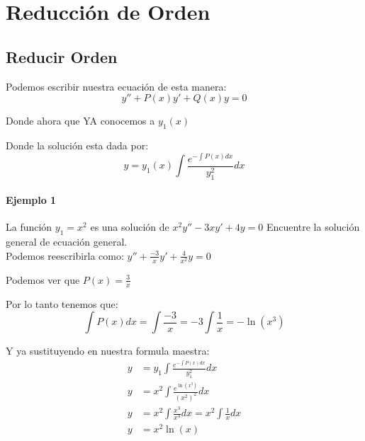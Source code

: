 \documentclass[12pt]{report}                                %
\begin{document}
\chapter{Reducción de Orden}
    \clearpage


    \section{Reducir Orden}

        Podemos escribir nuestra ecuación de esta manera:
        \begin{equation}
            y'' + P(x) y' + Q(x) y = 0
        \end{equation}

        Donde ahora que YA conocemos a $y_1(x)$

        Donde la solución esta dada por:
        \begin{equation}
            y = y_1(x) \int \frac{ e^{-\int P(x) dx} }{y_1^2} dx
        \end{equation}

    \clearpage
    \subsubsection{Ejemplo 1}
        La función $y_1 = x^2$ es una solución de $x^2 y'' - 3xy' +4y = 0$
        Encuentre la solución general de ecuación general. \\

        Podemos reescribirla como:
        $y'' + \frac{-3}{x}y' + \frac{4}{x^2}y = 0 $

        Podemos ver que $P(x) = \frac{3}{x}$

        Por lo tanto tenemos que:
        \begin{equation*}
            \int P(x) dx = \int \frac{-3}{x} = -3 \int \frac{1}{x} = -\ln (x^3)
        \end{equation*}

        Y ya sustituyendo en nuestra formula maestra:
        \begin{equation*}
        \begin{split}
            y &= y_1 \int \frac{ e^{-\int P(x) dx} }{y_1^2} dx          \\ 
            y &= x^2 \int \frac{ e^{\ln(x^3)} }{(x^2)^2} dx             \\
            y &= x^2 \int \frac{x^3}{x^4}dx = x^2 \int \frac{1}{x} dx   \\
            y &= x^2 \ln(x)
        \end{split}
        \end{equation*}
\end{document}
